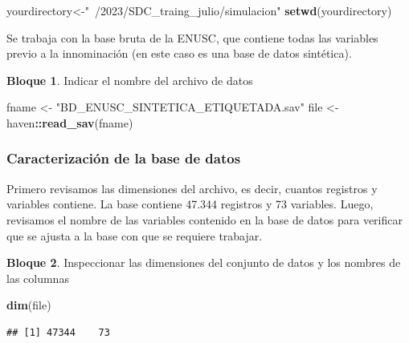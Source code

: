 \documentclass[]{book}
\newenvironment{Shaded}{\begin{snugshade}}{\end{snugshade}}
\newcommand{\KeywordTok}[1]{\textcolor[rgb]{0.13,0.29,0.53}{\textbf{#1}}}
\newcommand{\NormalTok}[1]{#1}
\newcommand{\OperatorTok}[1]{\textcolor[rgb]{0.81,0.36,0.00}{\textbf{#1}}}
\newcommand{\StringTok}[1]{\textcolor[rgb]{0.31,0.60,0.02}{#1}}
\theoremstyle{definition}
\theoremstyle{definition}
\newtheorem{example}{Bloque}[chapter]
\theoremstyle{definition}
\theoremstyle{definition}
\theoremstyle{remark}
\begin{document}
\begin{Shaded}
\begin{Highlighting}[]
\NormalTok{yourdirectory<-}\StringTok{"~/2023/SDC_traing_julio/simulacion"} 
\KeywordTok{setwd}\NormalTok{(yourdirectory)}
\end{Highlighting}
\end{Shaded}

Se trabaja con la base bruta de la ENUSC, que contiene todas las variables previo a la innominación (en este caso es una base de datos sintética).

\begin{example}
\protect\hypertarget{exm:bloque2nbm}{}{\label{exm:bloque2nbm} }Indicar el nombre del archivo de datos
\end{example}

\begin{Shaded}
\begin{Highlighting}[]
\NormalTok{fname <-}\StringTok{ "BD_ENUSC_SINTETICA_ETIQUETADA.sav"}
\NormalTok{file <-}\StringTok{ }\NormalTok{haven}\OperatorTok{::}\KeywordTok{read_sav}\NormalTok{(fname)}
\end{Highlighting}
\end{Shaded}

\hypertarget{caracterizaciuxf3n-de-la-base-de-datos}{%
\subsubsection{Caracterización de la base de datos}\label{caracterizaciuxf3n-de-la-base-de-datos}}

Primero revisamos las dimensiones del archivo, es decir, cuantos registros y variables contiene. La base contiene 47.344 registros y 73 variables. Luego, revisamos el nombre de las variables contenido en la base de datos para verificar que se ajusta a la base con que se requiere trabajar.

\begin{example}
\protect\hypertarget{exm:bloque3nbm}{}{\label{exm:bloque3nbm} }Inspeccionar las dimensiones del conjunto de datos y los nombres de las columnas
\end{example}

\begin{Shaded}
\begin{Highlighting}[]
\KeywordTok{dim}\NormalTok{(file)}
\end{Highlighting}
\end{Shaded}

\begin{verbatim}
## [1] 47344    73
\end{verbatim}
\end{document}

